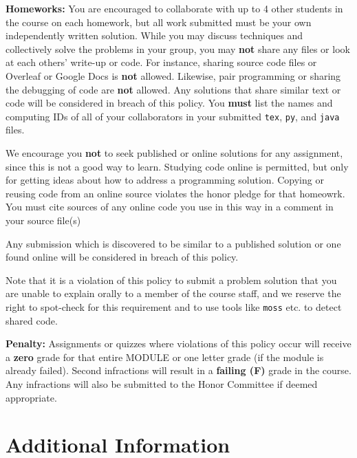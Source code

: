 \documentclass[12pt]{article}
\begin{document}
\textbf{Homeworks:} You are encouraged to collaborate with up to 4 other students in the course on each homework, but all work submitted must be your own independently written solution.  While you may discuss techniques and collectively solve the problems in your group, you may \textbf{not} share any files or look at each others' write-up or code. For instance, sharing source code files or Overleaf or Google Docs is \textbf{not} allowed.  Likewise, pair programming or sharing the debugging of code are \textbf{not} allowed.  Any solutions that share similar text or code will be considered in breach of this policy. You \textbf{must} list the names and computing IDs of all of your collaborators in your submitted \texttt{tex}, \texttt{py}, and \texttt{java} files.

We encourage you \textbf{not} to seek published or online solutions for any assignment, since this is not a good way to learn. Studying code online is permitted, but only for getting ideas about how to address a programming solution. 
Copying or reusing code from an online source violates the honor pledge for that homeowrk. 
You must cite sources of any online code you use in this way in a comment in your source file(s)

Any submission which is discovered to be similar to a published solution or one found online will be considered in breach of this policy.

Note that it is a violation of this policy to submit a problem solution that you are unable to explain orally to a member of the course staff, and we reserve the right to spot-check for this requirement and to use tools like {\tt moss} etc. to detect shared code.

\textbf{Penalty:} Assignments or quizzes where violations of this policy occur will receive a \textbf{zero} grade for that entire MODULE or one letter grade (if the module is already failed). Second infractions will result in a \textbf{failing (F)} grade in the course.  Any infractions will also be submitted to the Honor Committee if deemed appropriate.

\section*{Additional Information}

\end{document}
